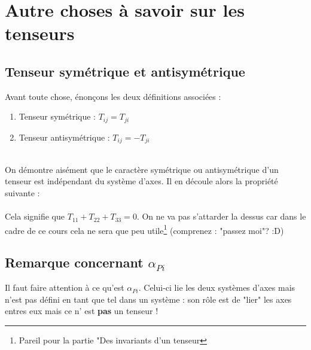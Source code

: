 \section{Autre choses à savoir sur les tenseurs}
    \subsection{Tenseur symétrique et antisymétrique}
        Avant toute chose, énonçons les deux définitions associées :
        \begin{enumerate}
        \item Tenseur symétrique : $T_{ij} = T_{ji}$
        \item Tenseur antisymétrique : $T_{ij} = -T_{ji}$
        \end{enumerate}
        
        \ \\
        
        On démontre aisément que le caractère symétrique ou antisymétrique d'un tenseur est 
        indépendant du système d'axes. Il en découle alors la propriété suivante :\\
        
        \ \\
        
        Cela signifie que $T_{11} + T_{22} + T_{33} = 0$. On ne va pas s'attarder la dessus car dans
        le cadre de ce cours cela ne sera que peu utile\footnote{Pareil pour la partie "Des invariants
        d'un tenseur} (comprenez : "passez moi"? :D)
    
    \subsection{Remarque concernant $\alpha_{Pi}$}
    Il faut faire attention à ce qu'est $\alpha_{Pi}$. Celui-ci lie les deux systèmes d'axes mais n'est
    pas défini en tant que tel dans un système : son rôle est de "lier" les axes entres eux mais ce n'
    est \textbf{pas} un tenseur ! 


